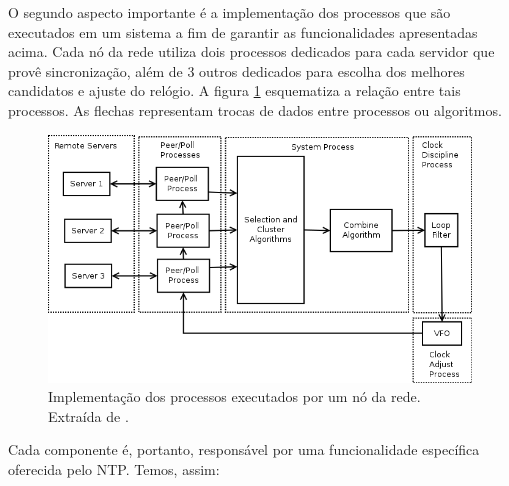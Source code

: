 O segundo aspecto importante é a implementação dos processos que são executados
em um sistema a fim de garantir as funcionalidades apresentadas acima. Cada nó
da rede utiliza dois processos dedicados para cada servidor que provê
sincronização, além de 3 outros dedicados para escolha dos melhores candidatos
e ajuste do relógio. A figura \ref{fig:modelo} esquematiza a relação entre tais
processos. As flechas representam trocas de dados entre processos ou algoritmos.
 
\FloatBarrier

\begin{figure}[h]
    
    \centering
    \includegraphics[scale=0.4]{image/ntp_implementation}
    \caption {Implementação dos processos executados por um nó da rede.
    Extraída de \cite{ntpv4rtp}.}
    \label{fig:modelo}
\end{figure} 

\FloatBarrier

Cada componente é, portanto, responsável por uma funcionalidade específica
oferecida pelo NTP. Temos, assim:

